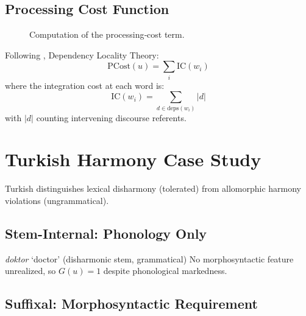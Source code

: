 \documentclass[12pt]{article}
\begin{document}
\subsection{Processing Cost Function}

\begin{figure}[h]
\centering
{}
\caption{Computation of the processing‑cost term.\label{fig:proc-cost}}
\end{figure}
Following \textcite{gibson2000}, Dependency Locality Theory:
\[
\text{PCost}(u) = \sum_{i} \text{IC}(w_i)
\]
where the integration cost at each word is:
\[
\text{IC}(w_i) = \sum_{d \in \text{deps}(w_i)} |d|
\]
with $|d|$ counting intervening discourse referents.

\section{Turkish Harmony Case Study}

Turkish distinguishes lexical disharmony (tolerated) from allomorphic harmony violations (ungrammatical).

\subsection{Stem-Internal: Phonology Only}

\ea
\textit{doktor} `doctor' (disharmonic stem, grammatical)
\z
No morphosyntactic feature unrealized, so $G(u) = 1$ despite phonological markedness.

\subsection{Suffixal: Morphosyntactic Requirement}
\end{document}
